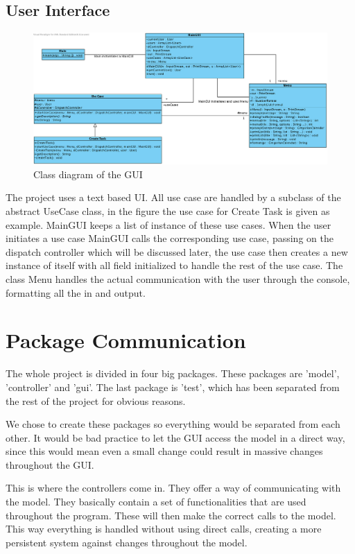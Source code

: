 		\subsection{User Interface}
			\begin{figure}[H]
				\begin{center}
					\includegraphics[width=1.0\textwidth]{images/gui.png}
				\end{center}
				\caption{Class diagram of the GUI}
			\end{figure}
			The project uses a text based UI. All use case are handled by a subclass of the abstract UseCase class, in the figure the use case for Create Task is given as example. MainGUI keeps a list of instance of these use cases. When the user initiates a use case MainGUI calls the corresponding use case, passing on the dispatch controller which will be discussed later, the use case then creates a new instance of itself with all field initialized to handle the rest of the use case. The class Menu handles the actual communication with the user through the console, formatting all the in and output.
			
	\section{Package Communication}
	       The whole project is divided in four big packages. These packages are 'model', 'controller' and 'gui'. The last package is 'test', which has been separated from the rest of the project for obvious reasons.
       
        We chose to create these packages so everything would be separated from each other. It would be bad practice to let the GUI access the model in a direct way, since this would mean even a small change could result in massive changes throughout the GUI. 
        
        This is where the controllers come in. They offer a way of communicating with the model. They basically contain a set of functionalities that are used throughout the program. These will then make the correct calls to the model. This way everything is handled without using direct calls, creating a more persistent system against changes throughout the model.
        
